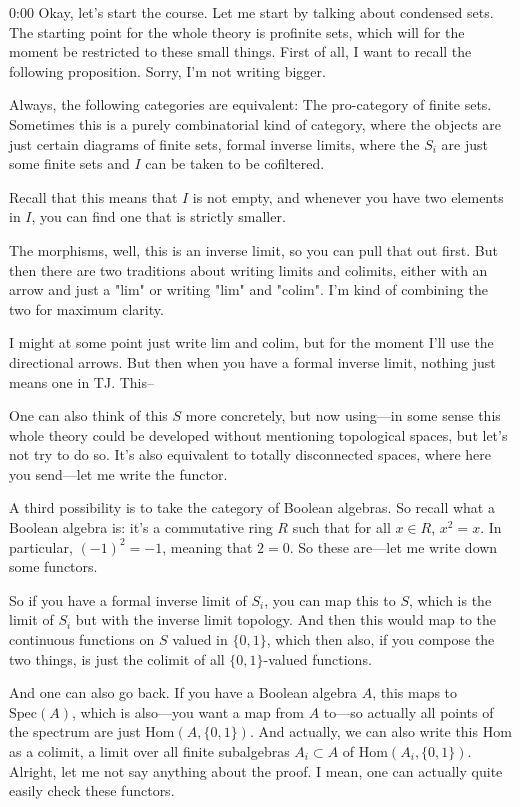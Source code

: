 \begin{unfinished}{0:00}
Okay, let's start the course. Let me start by talking about condensed sets. The starting point for the whole theory is profinite sets, which will for the moment be restricted to these small things. First of all, I want to recall the following proposition. Sorry, I'm not writing bigger.

Always, the following categories are equivalent: The pro-category of finite sets. Sometimes this is a purely combinatorial kind of category, where the objects are just certain diagrams of finite sets, formal inverse limits, where the $S_i$ are just some finite sets and $I$ can be taken to be cofiltered.

Recall that this means that $I$ is not empty, and whenever you have two elements in $I$, you can find one that is strictly smaller.

The morphisms, well, this is an inverse limit, so you can pull that out first. But then there are two traditions about writing limits and colimits, either with an arrow and just a "lim" or writing "lim" and "colim". I'm kind of combining the two for maximum clarity.

I might at some point just write lim and colim, but for the moment I'll use the directional arrows. But then when you have a formal inverse limit, nothing just means one in TJ. This--

One can also think of this $S$ more concretely, but now using---in some sense this whole theory could be developed without mentioning topological spaces, but let's not try to do so. It's also equivalent to totally disconnected spaces, where here you send---let me write the functor.

A third possibility is to take the category of Boolean algebras. So recall what a Boolean algebra is: it's a commutative ring $R$ such that for all $x \in R$, $x^2 = x$. In particular, $(-1)^2 = -1$, meaning that $2 = 0$. So these are---let me write down some functors.

So if you have a formal inverse limit of $S_i$, you can map this to $S$, which is the limit of $S_i$ but with the inverse limit topology. And then this would map to the continuous functions on $S$ valued in $\{0,1\}$, which then also, if you compose the two things, is just the colimit of all $\{0,1\}$-valued functions.

And one can also go back. If you have a Boolean algebra $A$, this maps to $\mathrm{Spec}(A)$, which is also---you want a map from $A$ to---so actually all points of the spectrum are just $\mathrm{Hom}(A, \{0,1\})$. And actually, we can also write this $\mathrm{Hom}$ as a colimit, a limit over all finite subalgebras $A_i \subset A$ of $\mathrm{Hom}(A_i, \{0,1\})$. Alright, let me not say anything about the proof. I mean, one can actually quite easily check these functors.


\end{unfinished}
